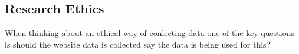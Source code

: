 \subsection{Research Ethics}

When thinking about an ethical way of conlecting data one of the key questions is should the website data is collected say the data is being used for this?